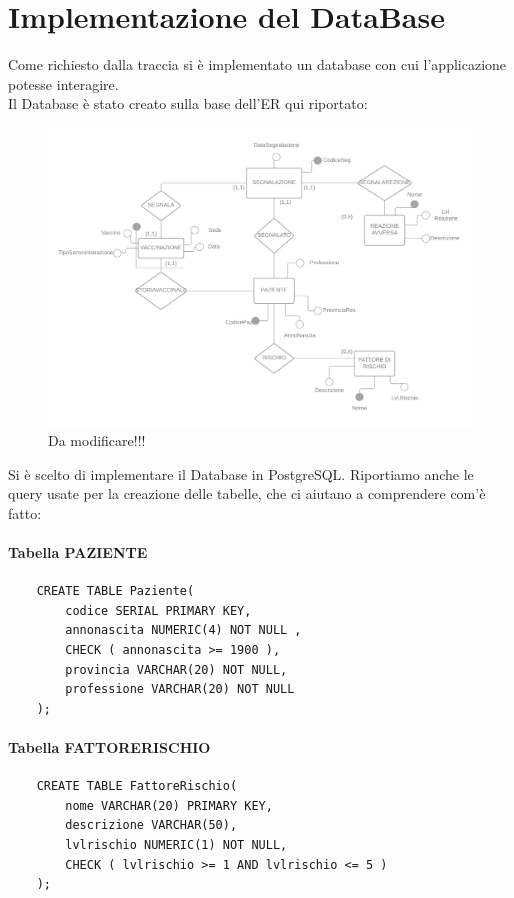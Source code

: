 \documentclass{article}
\begin{document}
\section{Implementazione del DataBase}
Come richiesto dalla traccia si è implementato un database con cui l'applicazione potesse interagire.\\
Il Database è stato creato sulla base dell'ER qui riportato:
\begin{figure}[h]
    \centering
    \includegraphics[width=1\textwidth]{pictures/_Diagramma vuoto.png}
    \caption{Da modificare!!!}
\end{figure}
Si è scelto di implementare il Database in PostgreSQL. Riportiamo anche le query usate per la creazione delle tabelle, che ci aiutano a comprendere com'è fatto:
\paragraph*{Tabella PAZIENTE}
\begin{verbatim}
    CREATE TABLE Paziente(
        codice SERIAL PRIMARY KEY,
        annonascita NUMERIC(4) NOT NULL ,
        CHECK ( annonascita >= 1900 ),
        provincia VARCHAR(20) NOT NULL,
        professione VARCHAR(20) NOT NULL
    );
\end{verbatim}
\paragraph*{Tabella FATTORERISCHIO}
\begin{verbatim}
    CREATE TABLE FattoreRischio(
        nome VARCHAR(20) PRIMARY KEY,
        descrizione VARCHAR(50),
        lvlrischio NUMERIC(1) NOT NULL,
        CHECK ( lvlrischio >= 1 AND lvlrischio <= 5 )
    );
\end{verbatim}
\end{document}
